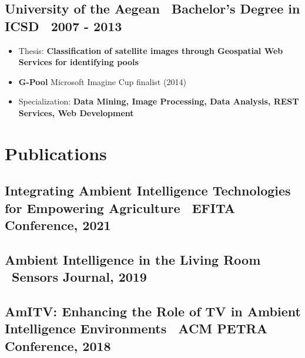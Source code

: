 \documentclass[a4paper,10pt]{article}
\begin{document}
\subsection*{ University of the Aegean \textbar\ Bachelor's Degree in ICSD \textbar\ 2007 - 2013}
\begin{adjustwidth}{1em}{1em}
    \begin{itemize}[left=0pt]
        \item Thesis: \textbf{Classification of satellite images through Geospatial Web Services for identifying pools}
        \item \textbf{G-Pool} Microsoft Imagine Cup finalist (2014)
        \item Specialization: \textbf{Data Mining, Image Processing, Data Analysis, REST Services, Web Development}
    \end{itemize}
\end{adjustwidth}


\vspace{2pt}

\section*{ Publications}
\subsection*{ Integrating Ambient Intelligence Technologies for Empowering Agriculture \textbar\ EFITA Conference, 2021}

\subsection*{ Ambient Intelligence in the Living Room \textbar\ Sensors Journal, 2019}

\subsection*{ AmITV: Enhancing the Role of TV in Ambient Intelligence Environments \textbar\ ACM PETRA Conference, 2018}

\vspace{2pt}
\end{document}
